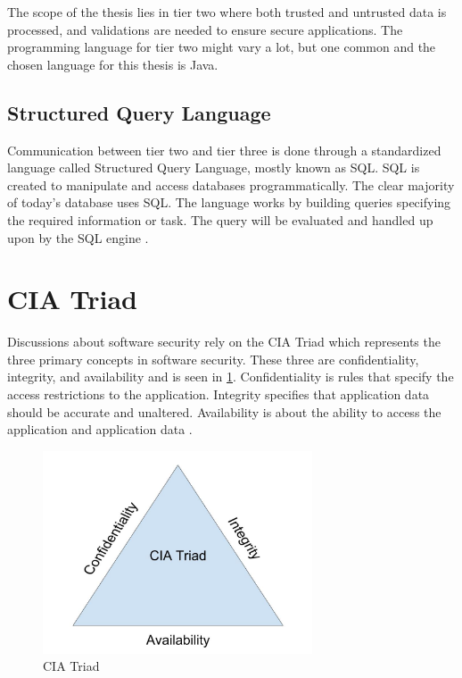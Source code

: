The scope of the thesis lies in tier two where both trusted and untrusted data is processed, and validations are needed to ensure secure applications. The programming language for tier two might vary a lot, but one common and the chosen language for this thesis is Java.



\subsection{Structured Query Language}
Communication between tier two and tier three is done through a standardized language called Structured Query Language, mostly known as SQL. SQL is created to manipulate and access databases programmatically. The clear majority of today's database uses SQL. The language works by building queries specifying the required information or task. The query will be evaluated and handled up upon by the SQL engine \parencite{DarieCristian2003TPGt}.



\section{CIA Triad}
\label{cia}
Discussions about software security rely on the CIA Triad which represents the three primary concepts in software security. These three are confidentiality, integrity, and availability and is seen in \ref{fig:CIATriad}. Confidentiality is rules that specify the access restrictions to the application. Integrity specifies that application data should be accurate and unaltered. Availability is about the ability to access the application and application data \parencite{2014C1-W}.

\begin{figure}[H]
    \centering
    \includegraphics[height=6cm]{images/CIATriad.jpg}
    \caption{CIA Triad}
    \label{fig:CIATriad}
\end{figure}



